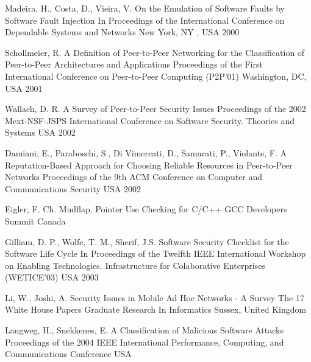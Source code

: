 \begin{thebibliography}{9}
		{Madeira, H., Costa, D., Vieira, V.} %
		{On the Emulation of Software Faults by Software Fault Injection}
		{In Proceedings of the International Conference on Dependable Systems and Networks}
		{New York, NY , USA}
		{2000}
	
		{Schollmeier, R.} %
		{A Definition of Peer-to-Peer Networking for the Classification of Peer-to-Peer Architectures and Applications}
		{Proceedings of the First International Conference on Peer-to-Peer Computing ({P2P}'01)}
		{Washington, DC, USA}
		{2001}

		{Wallach, D. R.} %
		{A Survey of Peer-to-Peer Security Issues}
		{Proceedings of the 2002 {M}ext-{NSF}-{JSPS} International Conference on Software Security. Theories and Systems}
		{USA}
		{2002}
	
		{Damiani, E., Paraboschi, S., Di Vimercati, D., Samarati, P., Violante, F.} %
		{A Reputation-Based Approach for Choosing Reliable Resources in Peer-to-Peer Networks}
		{Proceedings of the 9th ACM Conference on Computer and Communications Security}
		{USA}
		{2002}
		
		{Eigler, F. Ch.} %
		{Mudflap. Pointer Use Checking for {C/C++}}
		{{GCC} Developers Summit}
		{Canada}
		{}
	
		{Gilliam, D. P., Wolfe, T. M., Sherif, J.S.} %
		{Software Security Checklist for the Software Life Cycle}
		{In Proceedings of the Twelfth {IEEE} International Workshop on Enabling Technologies. Infrastructure for Colaborative Enterprises ({WETICE}'03)}
		{USA}
		{2003}
	
		{Li, W., Joshi, A.} %
		{Security Issues in Mobile Ad Hoc Networks - A Survey}
		{The 17 White House Papers Graduate Research In Informatics}
		{Sussex, United Kingdom}
		{}
	
		{Langweg, H., Snekkenes, E.} %
		{A Classification of Malicious Software Attacks}
		{Proceedings of the 2004 IEEE International Performance, Computing, and Communications Conference}
		{USA}
		{}
	

\end{thebibliography}
